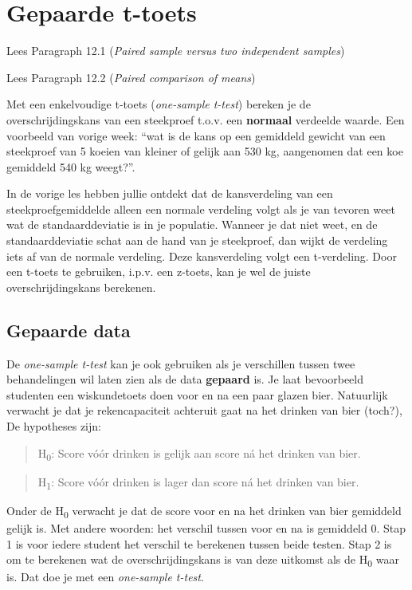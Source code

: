 \documentclass[]{book}
\theoremstyle{definition}
\theoremstyle{definition}
\theoremstyle{definition}
\theoremstyle{remark}
\let\BeginKnitrBlock\begin \let\EndKnitrBlock\end
\begin{document}
\chapter{Gepaarde t-toets}\label{gepaarde-t-toets}

\BeginKnitrBlock{ABD}
Lees Paragraph 12.1 (\emph{Paired sample versus two independent
samples})

Lees Paragraph 12.2 (\emph{Paired comparison of means})
\EndKnitrBlock{ABD}

Met een enkelvoudige t-toets (\emph{one-sample t-test}) bereken je de
overschrijdingskans van een steekproef t.o.v. een \textbf{normaal}
verdeelde waarde. Een voorbeeld van vorige week: ``wat is de kans op een
gemiddeld gewicht van een steekproef van 5 koeien van kleiner of gelijk
aan 530 kg, aangenomen dat een koe gemiddeld 540 kg weegt?''.

In de vorige les hebben jullie ontdekt dat de kansverdeling van een
steekproefgemiddelde alleen een normale verdeling volgt als je van
tevoren weet wat de standaarddeviatie is in je populatie. Wanneer je dat
niet weet, en de standaarddeviatie schat aan de hand van je steekproef,
dan wijkt de verdeling iets af van de normale verdeling. Deze
kansverdeling volgt een t-verdeling. Door een t-toets te gebruiken,
i.p.v. een z-toets, kan je wel de juiste overschrijdingskans berekenen.

\section{Gepaarde data}\label{gepaarde-data}

De \emph{one-sample t-test} kan je ook gebruiken als je verschillen
tussen twee behandelingen wil laten zien als de data \textbf{gepaard}
is. Je laat bevoorbeeld studenten een wiskundetoets doen voor en na een
paar glazen bier. Natuurlijk verwacht je dat je rekencapaciteit
achteruit gaat na het drinken van bier (toch?), De hypotheses zijn:

\begin{quote}
H\textsubscript{0}: Score vóór drinken is gelijk aan score ná het
drinken van bier.
\end{quote}

\begin{quote}
H\textsubscript{1}: Score vóór drinken is lager dan score ná het drinken
van bier.
\end{quote}

Onder de H\textsubscript{0} verwacht je dat de score voor en na het
drinken van bier gemiddeld gelijk is. Met andere woorden: het verschil
tussen voor en na is gemiddeld 0. Stap 1 is voor iedere student het
verschil te berekenen tussen beide testen. Stap 2 is om te berekenen wat
de overschrijdingskans is van deze uitkomst als de H\textsubscript{0}
waar is. Dat doe je met een \emph{one-sample t-test}.
\end{document}
